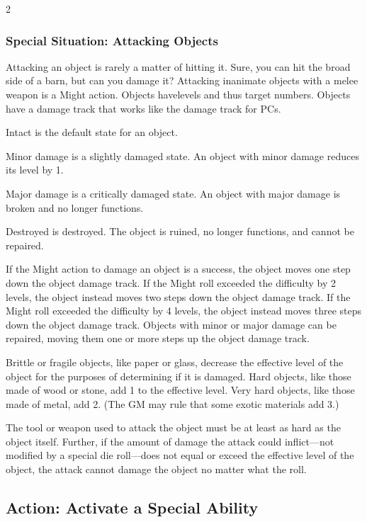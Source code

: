 \begin{multicols}{2}
\subsubsection{Special Situation: Attacking Objects} 

Attacking an object is rarely a matter of hitting it. Sure, you can hit the broad side of a barn, but can you damage it? Attacking inanimate objects with a melee weapon is a Might action. Objects havelevels and thus target numbers. Objects have a damage track that works like the damage track for PCs.

Intact is the default state for an object. 

Minor damage is a slightly damaged state. An object with minor damage reduces its level by 1.

Major damage is a critically damaged state. An object with major damage is broken and no longer functions. 

Destroyed is destroyed. The object is ruined, no longer functions, and cannot be repaired. 

If the Might action to damage an object is a success, the object moves one step down the object damage track. If the Might roll exceeded the difficulty by 2 levels, the object instead moves two steps down the object damage track. If the Might roll exceeded the difficulty by 4 levels, the object instead moves three steps down the object damage track. Objects with minor or major damage can be repaired, moving them one or more steps up the object damage track.

Brittle or fragile objects, like paper or glass, decrease the effective level of the object for the purposes of determining if it is damaged. Hard objects, like those made of wood or stone, add 1 to the effective level. Very hard objects, like those made of metal, add 2. (The GM may rule that some exotic materials add 3.)

The tool or weapon used to attack the object must be at least as hard as the object itself. Further, if the amount of damage the attack could inflict—not modified by a special die roll—does not equal or exceed the effective level of the object, the attack cannot damage the object no matter what the roll.

\subsection{Action: Activate a Special Ability}


\end{multicols}
